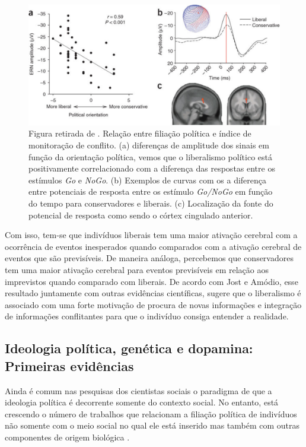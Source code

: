 \begin{figure}
    \includegraphics[width=\linewidth]{Figures/amodio} 
    \caption{
        Figura retirada de \citep{Amodio2007}. Relação entre filiação
        política e índice de monitoração de conflito.  (a) diferenças
        de amplitude dos sinais em função da orientação política,
        vemos que o liberalismo político está positivamente correlacionado
        com a diferença das respostas entre os estímulos \textit{Go}
        e \textit{NoGo}. (b) Exemplos de curvas com os a diferença entre
        potenciais de resposta entre os  estímulo \textit{Go/NoGo} em função
        do tempo para conservadores e liberais. (c) Localização da fonte
        do potencial de resposta como sendo o córtex cingulado anterior.
    } 
    \label{fig:amodio}
\end{figure}

Com isso, tem-se que indivíduos liberais tem uma maior ativação cerebral
com a ocorrência de eventos inesperados quando comparados com a ativação
cerebral de eventos que são previsíveis. De maneira análoga, percebemos que
conservadores tem uma maior ativação cerebral para eventos previsíveis em
relação aos imprevistos quando comparado com liberais.  De acordo com Jost
e Amódio\citep{Jost2011}, esse resultado juntamente com outras evidências
científicas, sugere que o liberalismo é associado com uma forte motivação
de procura de novas informações e integração de informações conflitantes
para que o indivíduo consiga entender a realidade.

\subsection{Ideologia política, genética e dopamina:\\Primeiras evidências} %

Ainda é comum nas pesquisas dos cientistas sociais o paradigma de que a
ideologia política é decorrente somente do contexto social. No entanto,
está crescendo o número de trabalhos que relacionam a filiação
política de indivíduos não somente com o meio social no qual ele
está inserido mas também com outras componentes de origem biológica
\citep{Fowler2008,Dawes2009,Settle2010,Hatemi2011}.

